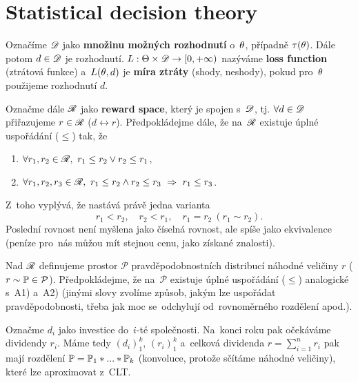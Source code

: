 \section{Statistical decision theory}

\begin{define}
	Označíme $\mathscr{D}$ jako \textbf{množinu možných rozhodnutí} o~$\theta$, případně $\tau(\theta)$. Dále potom $d\in\mathscr{D}$ je rozhodnutí. $L:\Theta\times\mathscr{D}\to[0,+\infty)$ nazýváme \textbf{loss function} (ztrátová funkce) a~$L(\theta,d)$ je \textbf{míra ztráty} (shody, neshody), pokud pro~$\theta$ použijeme rozhodnutí $d$.
	
	Označme dále $\mathscr{R}$ jako \textbf{reward space}, který je spojen s~$\mathscr{D}$, tj. $\forall d\in\mathscr{D}$ přiřazujeme $r\in\mathscr{R}$ ($d\leftrightarrow r$). Předpokládejme dále, že na~$\mathscr{R}$ existuje úplné uspořádání ($\leq$) tak, že \begin{enumerate}[{A}1)]
		\item $\forall r_1,r_2\in\mathscr{R},~r_1\leq r_2 \vee r_2\leq r_1$,
		\item $\forall r_1,r_2,r_3\in\mathscr{R},~r_1\leq r_2 \wedge r_2\leq r_3~\Rightarrow~r_1\leq r_3$. 
	\end{enumerate}Z~toho vyplývá, že nastává právě jedna varianta
$$ r_1<r_2,\quad r_2<r_1,\quad r_1=r_2~(r_1\sim r_2).$$
Poslední rovnost není myšlena jako číselná rovnost, ale spíše jako ekvivalence (peníze pro~nás můžou mít stejnou cenu, jako získané znalosti).

	Nad $\mathscr{R}$ definujeme prostor $\mathcal{P}$ pravděpodobnostních distribucí náhodné veličiny $r$ ($r\sim\mathbb{P}\in\mathcal{P}$). Předpokládejme, že na~$\mathcal{P}$ existuje úplné uspořádání ($\leq$) analogické s~A1) a~A2) (jinými slovy zvolíme způsob, jakým lze uspořádat pravděpodobnosti, třeba jak moc se~odchylují od~rovnoměrného rozdělení apod.).
\end{define}

\begin{example}[Motivace] 
	Označme $d_i$ jako investice do~$i$-té společnosti. Na~konci roku pak očekáváme dividendy $r_i$. Máme tedy $(d_i)_1^k$, $(r_i)_1^k$ a~celková dividenda $r=\sum_{i=1}^n r_i$ pak mají rozdělení $\mathbb{P}=\mathbb{P}_1\ast...\ast\mathbb{P}_k$ (konvoluce, protože sčítáme náhodné veličiny), které lze aproximovat z~CLT.
\end{example}

